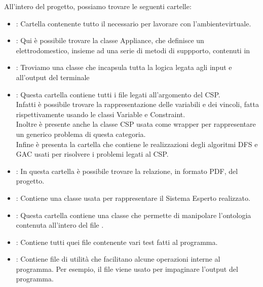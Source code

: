 \documentclass[12pt, letterpaper]{article}
\begin{document}
All'intero del progetto, possiamo trovare le seguenti cartelle:
\begin{itemize}
      \item {}: Cartella contenente tutto il necessario per lavorare con
            l'ambientevirtuale.
      \item {}: Qui è possibile trovare la classe Appliance, che definisce
            un elettrodomestico, insieme ad una serie di metodi di suppporto,
            contenuti in 

      \item {}: Troviamo una classe che incapsula tutta la logica legata agli input
            e all'output del terminale

      \item {}: Questa cartella contiene tutti i file legati all'argomento del
            CSP. \\
            Infatti è possibile trovare la rappresentazione delle variabili e dei vincoli, fatta
            rispettivamente usando le classi Variable e Constraint. \\
            Inoltre è presente anche la classe CSP usata come wrapper per rappresentare un generico
            problema di questa categoria. \\
            Infine è presenta la cartella  che contiene le realizzazioni degli
            algoritmi DFS e GAC usati per risolvere i problemi legati al CSP.

      \item {}: In questa cartella è possibile trovare la relazione, in formato PDF, del
            progetto.

      \item {}: Contiene una classe usata per rappresentare il Sistema Esperto
            realizzato.

      \item {}: Questa cartella contiene una classe che permette di manipolare
            l'ontologia contenuta all'intero del file .

      \item {}: Contiene tutti quei file contenente vari test fatti al programma.

      \item {}: Contiene file di utilità che facilitano alcune operazioni interne al programma.
            Per esempio, il file  viene usato per impaginare l'output del programma.
\end{itemize}
\end{document}

